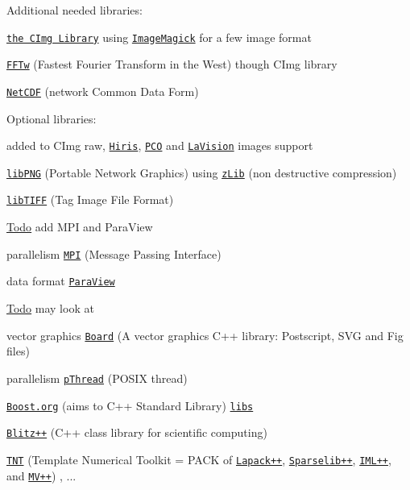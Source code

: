 \begin{DoxyParagraph}{Additional needed libraries:}

\end{DoxyParagraph}
\begin{DoxyItemize}
\item \href{http://cimg.sourceforge.net}{\tt the CImg Library} using \href{http://www.imagemagick.org/}{\tt ImageMagick} for a few image format \item \href{http://www.fftw.org/}{\tt FFTw} (Fastest Fourier Transform in the West) though CImg library \item \href{http://www.unidata.ucar.edu/software/netcdf/}{\tt NetCDF} (network Common Data Form)\end{DoxyItemize}
\begin{DoxyParagraph}{Optional libraries:}

\end{DoxyParagraph}
\begin{DoxyItemize}
\item added to CImg raw, \href{http://www.rd-vision.com/}{\tt Hiris}, \href{http://www.pco.de/}{\tt PCO} and \href{http://www.lavision.de}{\tt LaVision} images support \item \href{http://www.libpng.org/}{\tt libPNG} (Portable Network Graphics) using \href{http://www.zlib.net/}{\tt zLib} (non destructive compression) \item \href{http://www.libtiff.org/}{\tt libTIFF} (Tag Image File Format) \begin{Desc}
\item[\hyperlink{todo__todo000004}{Todo}]add MPI and ParaView \end{Desc}
\item parallelism \href{http://www.open-mpi.org/}{\tt MPI} (Message Passing Interface) \item data format \href{http://www.paraview.org/}{\tt ParaView} \begin{Desc}
\item[\hyperlink{todo__todo000005}{Todo}]may look at \end{Desc}
\item vector graphics \href{http://libboard.sourceforge.net/}{\tt Board} (A vector graphics C++ library: Postscript, SVG and Fig files) \item parallelism \href{http://www.gnu.org/software/pth/}{\tt pThread} (POSIX thread) \item \href{http://www.boost.org/}{\tt Boost.org} (aims to C++ Standard Library) \href{http://www.boost.org/libs/libraries.htm}{\tt libs} \item \href{http://www.oonumerics.org/blitz/}{\tt Blitz++} (C++ class library for scientific computing) \item \href{http://math.nist.gov/tnt/}{\tt TNT} (Template Numerical Toolkit = PACK of \href{http://math.nist.gov/lapack++/}{\tt Lapack++}, \href{http://math.nist.gov/sparselib++/}{\tt Sparselib++}, \href{http://math.nist.gov/iml++/}{\tt IML++}, and \href{http://math.nist.gov/mv++/}{\tt MV++}) , ...\end{DoxyItemize}
